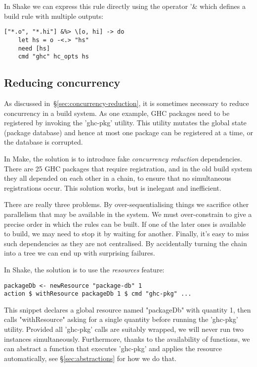 In Shake we can express this rule directly using the operator \lst'&%
which defines a build rule with multiple outputs:


\begin{lstlisting}
["*.o", "*.hi"] &%> \[o, hi] -> do
    let hs = o -<.> "hs"
    need [hs]
    cmd "ghc" hc_opts hs
\end{lstlisting}

\subsection{Reducing concurrency\label{sec:ghc-pkg-db}}

As discussed in~\S\ref{sec:concurrency-reduction}, it is sometimes necessary to
reduce concurrency in a build system. As one example, GHC packages need to
be registered by invoking the \lst'ghc-pkg' utility. This utility mutates the
global state (package database) and hence at most one package can be registered
at a time, or the database is corrupted.

In Make, the solution is to introduce fake \emph{concurrency
reduction} dependencies. There are 25 GHC packages that require registration,
and in the old build system they all depended on each other in a chain, to
ensure that no simultaneous registrations occur. This solution works, but is
inelegant and inefficient.

There are really three problems. By over-sequentialising things we sacrifice
other parallelism that may be available in the system. We must over-constrain to
give a precise order in which the rules can be built. If one of the later ones
is available to build, we may need to stop it by waiting for another. Finally,
it's easy to miss such dependencies as they are not centralised. By accidentally
turning the chain into a tree we can end up with surprising failures.

In Shake, the solution is to use the \emph{resources} feature:

\begin{lstlisting}
packageDb <- newResource "package-db" 1
action $ withResource packageDb 1 $ cmd "ghc-pkg" ...
\end{lstlisting}

This snippet declares a global resource named \lst"packageDb" with quantity 1,
then calls \lst"withResource" asking for a single quantity before running the
\lst'ghc-pkg' utility. Provided all \lst'ghc-pkg' calls are suitably wrapped,
we will never run two instances simultaneously. Furthermore, thanks to the
availability of functions, we can abstract a function that executes
\lst'ghc-pkg' and applies the resource automatically, see
\S\ref{sec:abstractions} for how we do that.

